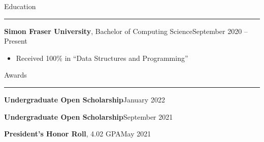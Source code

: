 \documentclass{article}
\newcommand{\entrytitlesimple}[2]{\vspace{0.5em}\textbf{#1}\hfill #2}
\newcommand{\entrytitleskip}{\par\vspace{-0.7em}}
\newcommand{\entrytitle}[3]{\vspace{0.5em}\textbf{#1}, #2\hfill #3}
\renewcommand{\section}[1]{\vspace{0.5em}\Large{#1}\vspace{0.3em}\hrule\normalsize{}}
\newenvironment{entrybody}{\begin{itemize}[itemsep=0.3em]}{\end{itemize}}
\begin{document}
\section{Education}

\entrytitle{Simon Fraser University}{Bachelor of Computing Science}{September 2020 – Present}
\begin{entrybody}
\item Received 100\% in ``Data Structures and Programming''
\end{entrybody}


\section{Awards}

\entrytitlesimple{Undergraduate Open Scholarship}{January 2022} \entrytitleskip
\entrytitlesimple{Undergraduate Open Scholarship}{September 2021} \entrytitleskip
\entrytitle{President's Honor Roll}{4.02 GPA}{May 2021}
\end{document}
